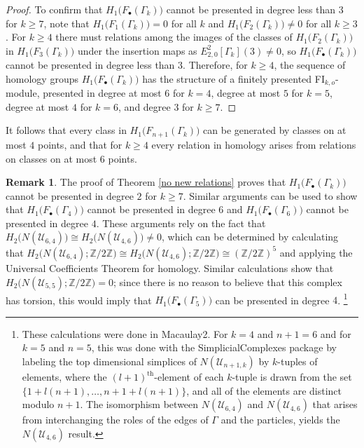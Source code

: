 \documentclass[pagebackref,colorlinks,citecolor=blue,linkcolor=blue,urlcolor=blue,filecolor=blue]{article}
\theoremstyle{definition}\newtheorem{definition}[thm]{Definition}
\theoremstyle{definition}
\newtheorem{remark}[thm]{Remark}
\newcommand{\Z}{\ensuremath{\mathbb{Z}}}
\begin{document}
\begin{proof}
To confirm that $H_{1}\big(F_{\bullet}(\Gamma_{k})\big)$ cannot be presented in degree less than $3$ for $k\ge 7$, note that $H_{1}\big(F_{1}(\Gamma_{k})\big)=0$ for all $k$ and $H_{1}\big(F_{2}(\Gamma_{k})\big)\neq 0$ for all $k\ge 3$.
For $k\ge 4$ there must relations among the images of the classes of $H_{1}\big(F_{2}(\Gamma_{k})\big)$ in $H_{1}\big(F_{3}(\Gamma_{k})\big)$ under the insertion maps as $E^{2}_{2, 0}[\Gamma_{k}](3)\neq 0$, so $H_{1}\big(F_{\bullet}(\Gamma_{k})\big)$ cannot be presented in degree less than $3$.
Therefore, for $k\ge 4$, the sequence of homology groups $H_{1}\big(F_{\bullet}(\Gamma_{k})\big)$ has the structure of a finitely presented FI$_{k,o}$-module, presented in degree at most $6$ for $k=4$, degree at most $5$ for $k=5$, degree at most $4$ for $k=6$,  and degree $3$ for $k\ge 7$.
\end{proof}

It follows that every class in $H_{1}\big(F_{n+1}(\Gamma_{k})\big)$ can be generated by classes on at most $4$ points, and that for $k\ge 4$ every relation in homology arises from relations on classes on at most $6$ points.

\begin{remark}
The proof of Theorem \ref{no new relations} proves that $H_{1}\big(F_{\bullet}(\Gamma_{k})\big)$ cannot be presented in degree $2$ for $k\ge 7$.
Similar arguments can be used to show that $H_{1}\big(F_{\bullet}(\Gamma_{4})\big)$ cannot be presented in degree $6$ and $H_{1}\big(F_{\bullet}(\Gamma_{6})\big)$ cannot be presented in degree $4$.
These arguments rely on the fact that $H_{2}\big(N(\mathcal{U}_{6,4})\big)\cong H_{2}\big(N(\mathcal{U}_{4,6})\big)\neq0$, which can be determined by calculating that $H_{2}\big(N(\mathcal{U}_{6,4});\Z/2\Z\big)\cong H_{2}\big(N(\mathcal{U}_{4,6});\Z/2\Z\big)\cong (\Z/2\Z)^{5}$ and applying the Universal Coefficients Theorem for homology.
Similar calculations show that $H_{2}\big(N(\mathcal{U}_{5,5});\Z/2\Z\big)=0$; since there is no reason to believe that this complex has torsion, this would imply that $H_{1}\big(F_{\bullet}(\Gamma_{5})\big)$ can be presented in degree $4$.
\footnote{These calculations were done in Macaulay2. For $k=4$ and $n+1=6$ and for $k=5$ and $n=5$, this was done with the SimplicialComplexes package by labeling the top dimensional simplices of $N(\mathcal{U}_{n+1,k})$ by $k$-tuples of elements, where the $(l+1)^{\text{th}}$-element of each $k$-tuple is drawn from the set $\{1+l(n+1), \dots, n+1+l(n+1)\}$, and all of the elements are distinct modulo $n+1$. The isomorphism between $N(\mathcal{U}_{6,4})$ and $N(\mathcal{U}_{4,6})$ that arises from interchanging the roles of the edges of $\Gamma$ and the particles, yields the $N(\mathcal{U}_{4,6})$ result.}
\end{remark}
\end{document}
